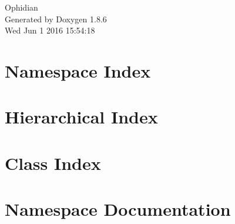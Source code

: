 \documentclass[twoside]{book}
\newcommand{\clearemptydoublepage}{%
  \newpage{\pagestyle{empty}\cleardoublepage}%
}
\begin{document}
\hypersetup{pageanchor=false}
\begin{titlepage}
\vspace*{7cm}
\begin{center}%
{\Large Ophidian }\\
\vspace*{1cm}
{\large Generated by Doxygen 1.8.6}\\
\vspace*{0.5cm}
{\small Wed Jun 1 2016 15:54:18}\\
\end{center}
\end{titlepage}
\clearemptydoublepage
\tableofcontents
\clearemptydoublepage
{}
\hypersetup{pageanchor=true}

\chapter{Namespace Index}

\chapter{Hierarchical Index}

\chapter{Class Index}

\chapter{Namespace Documentation}








\end{document}
